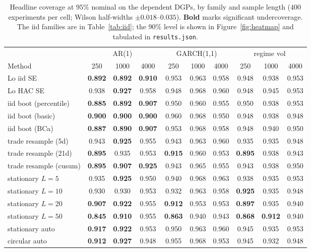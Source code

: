 \documentclass[11pt]{article}
\begin{document}
\begin{table}[t]
\centering
\caption{Headline coverage at $95\%$ nominal on the dependent DGPs, by family
and sample length ($400$ experiments per cell; Wilson half-widths
$\pm 0.018$--$0.035$). \textbf{Bold} marks significant undercoverage. The iid
families are in Table~\ref{tab:iid}; the $90\%$ level is shown in
Figure~\ref{fig:heatmap} and tabulated in \texttt{results.json}.}
\label{tab:dependent}
\small
\setlength{\tabcolsep}{4.5pt}
\begin{tabular}{lccc@{\hskip 1.4em}ccc@{\hskip 1.4em}ccc}
\toprule
& \multicolumn{3}{c}{AR(1)} & \multicolumn{3}{c}{GARCH(1,1)} & \multicolumn{3}{c}{regime vol}\\
\cmidrule(lr){2-4}\cmidrule(lr){5-7}\cmidrule(lr){8-10}
Method & 250 & 1000 & 4000 & 250 & 1000 & 4000 & 250 & 1000 & 4000 \\
\midrule
Lo iid SE             & \textbf{0.892} & \textbf{0.892} & \textbf{0.910} & 0.953 & 0.963 & 0.958 & 0.948 & 0.938 & 0.953 \\
Lo HAC SE             & 0.938 & \textbf{0.927} & 0.958 & 0.948 & 0.968 & 0.960 & 0.948 & 0.945 & 0.953 \\
iid boot (percentile) & \textbf{0.885} & \textbf{0.892} & \textbf{0.907} & 0.950 & 0.960 & 0.955 & 0.950 & 0.938 & 0.953 \\
iid boot (basic)      & \textbf{0.900} & \textbf{0.900} & \textbf{0.900} & 0.960 & 0.968 & 0.950 & 0.948 & 0.938 & 0.948 \\
iid boot (BCa)        & \textbf{0.887} & \textbf{0.890} & \textbf{0.907} & 0.953 & 0.968 & 0.958 & 0.948 & 0.940 & 0.950 \\
trade resample (5d)   & 0.943 & \textbf{0.925} & 0.955 & 0.943 & 0.963 & 0.960 & 0.935 & 0.935 & 0.948 \\
trade resample (21d)  & \textbf{0.895} & 0.935 & 0.953 & \textbf{0.915} & 0.960 & 0.953 & \textbf{0.895} & 0.938 & 0.943 \\
trade resample (cusum)& \textbf{0.895} & \textbf{0.907} & \textbf{0.925} & 0.943 & 0.965 & 0.955 & 0.943 & 0.938 & 0.950 \\
stationary $L{=}5$    & 0.935 & \textbf{0.925} & 0.950 & 0.940 & 0.968 & 0.963 & 0.938 & 0.935 & 0.953 \\
stationary $L{=}10$   & 0.930 & 0.930 & 0.953 & 0.932 & 0.963 & 0.958 & \textbf{0.925} & 0.935 & 0.948 \\
stationary $L{=}20$   & \textbf{0.907} & \textbf{0.922} & 0.955 & \textbf{0.912} & 0.953 & 0.953 & \textbf{0.897} & 0.935 & 0.940 \\
stationary $L{=}50$   & \textbf{0.845} & \textbf{0.910} & 0.955 & \textbf{0.863} & 0.940 & 0.943 & \textbf{0.868} & \textbf{0.912} & 0.940 \\
stationary auto       & \textbf{0.917} & \textbf{0.922} & 0.953 & 0.950 & 0.963 & 0.960 & 0.945 & 0.935 & 0.953 \\
circular auto         & \textbf{0.912} & \textbf{0.927} & 0.948 & 0.955 & 0.968 & 0.953 & 0.945 & 0.932 & 0.948 \\
\bottomrule
\end{tabular}
\end{table}
\end{document}
